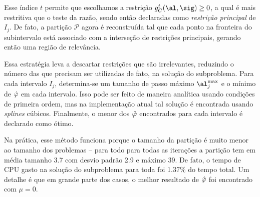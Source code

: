Esse índice $t$ permite que escolhamos a restrição $g_{C}^{t}(\al,\sig)\geq0$, a qual é mais restritiva que o teste da razão,   sendo  então declaradas como \emph{restrição principal}  de $I_{j}$. De fato, a partição $\mathcal{P}$ agora é reconstruída tal que cada ponto na fronteira do subintervalo está associado com a interseção de restrições principais, gerando então uma região de relevância.

Essa estratégia leva a descartar restrições que são irrelevantes, reduzindo o número das que precisam ser utilizadas de fato, na solução do subproblema.  Para cada intervalo $I_{j}$, determina-se um tamanho de passo máximo $\al^{\max}_{j}$ e o mínimo de $\hat{\varphi}$ em cada intervalo. Isso pode ser feito de maneira analítica usando condições de primeira ordem, mas na implementação atual tal solução é encontrada usando \emph{splines} cúbicos. Finalmente, o menor dos $\hat{\varphi}$ encontrados para cada intervalo é declarado como ótimo.

Na prática, esse método funciona porque o tamanho da partição é muito menor ao tamanho dos problemas -- para todo  para todas as iterações a partição tem em média tamanho \num{3.7} com desvio padrão \num{2.9} e máximo \num{39}. De fato, o tempo  de CPU gasto na solução do subproblema  para toda  foi \num{1,37}\% do tempo total. Um detalhe é que em grande parte dos casos, o melhor resultado de $\hat{\varphi}$ foi encontrado com $\mu=0$.



